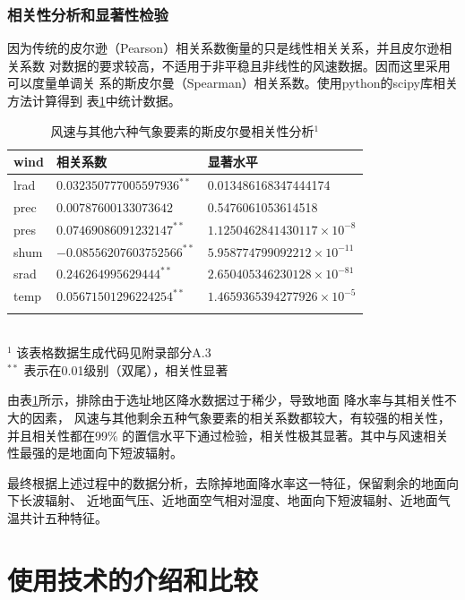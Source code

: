 \documentclass[AutoFakeBold]{LZUThesis}
\begin{document}
\subsection{相关性分析和显著性检验}
因为传统的皮尔逊（Pearson）相关系数衡量的只是线性相关关系，并且皮尔逊相关系数
对数据的要求较高，不适用于非平稳且非线性的风速数据。因而这里采用可以度量单调关
系的斯皮尔曼（Spearman）相关系数。使用python的scipy库相关方法计算得到
表\ref{relativity-analysis}中统计数据。

\begin{table}[H]
    \centering
    \caption{风速与其他六种气象要素的斯皮尔曼相关性分析$^1$}
    \begin{tabular}{lll}
    \toprule
    wind & 相关系数 & 显著水平 \\
    \midrule
    lrad & $0.032350777005597936^{**}$ & 0.013486168347444174 \\
    prec & $0.00787600133073642$ & 0.5476061053614518 \\
    pres & $0.07469086091232147^{**}$ & $1.1250462841430117\times10^{-8}$ \\
    shum & $-0.08556207603752566^{**}$ & $5.958774799092212\times10^{-11}$ \\
    srad & $0.246264995629444^{**}$ & $2.650405346230128\times10^{-81}$ \\
    temp & $0.05671501296224254^{**}$ & $1.4659365394277926\times10^{-5}$ \\
    \bottomrule \\
    \end{tabular} \\
    \footnotesize{$^1$ 该表格数据生成代码见附录部分A.3} \\
    \footnotesize{$^{**}$ 表示在0.01级别（双尾），相关性显著} \\
    \label{relativity-analysis}
\end{table}

由表\ref{relativity-analysis}所示，排除由于选址地区降水数据过于稀少，导致地面
降水率与其相关性不大的因素，
风速与其他剩余五种气象要素的相关系数都较大，有较强的相关性，并且相关性都在99\%
的置信水平下通过检验，相关性极其显著。其中与风速相关性最强的是地面向下短波辐射。

最终根据上述过程中的数据分析，去除掉地面降水率这一特征，保留剩余的地面向下长波辐射、
近地面气压、近地面空气相对湿度、地面向下短波辐射、近地面气温共计五种特征。


\chapter{使用技术的介绍和比较}
\end{document}
